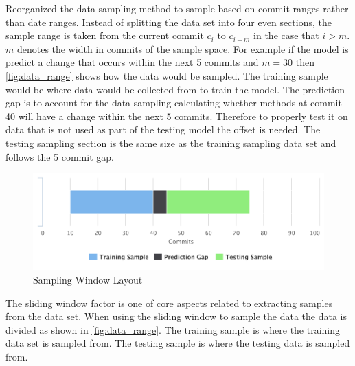 

Reorganized the data sampling method to sample based on commit ranges rather than date ranges. Instead of splitting the data set into four even sections, the sample range is taken from the current commit $c_i$ to $c_{i-m}$ in the case that $i > m$. $m$ denotes the width in commits of the sample space. For example if the model is predict a change that occurs within the next 5 commits and $m = 30$ then \autoref{fig:data_range} shows how the data would be sampled. The training sample would be where data would be collected from to train the model. The prediction gap is to account for the data sampling calculating whether methods at commit 40 will have a change within the next 5 commits. Therefore to properly test it on data that is not used as part of the testing model the offset is needed. The testing sampling section is the same size as the training sampling data set and follows the 5 commit gap.

\begin{figure}[!ht]
    \centering
        \includegraphics[width=1.0\textwidth]{images/exp_data_range}
    \caption{Sampling Window Layout}
    \label{fig:data_range}
\end{figure}


The sliding window factor is one of core aspects related to extracting samples from the data set. When using the sliding window to sample the data the data is divided as shown in \autoref{fig:data_range}. The training sample is where the training data set is sampled from. The testing sample is where the testing data is sampled from. 

